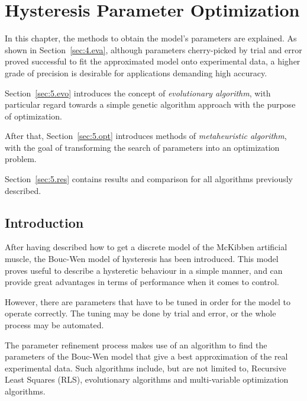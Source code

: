 
\chapter{Hysteresis Parameter Optimization}
\label{ch:optimization}

In this chapter, the methods to obtain the model's parameters are explained.
As shown in Section~\ref{sec:4.eva}, although parameters cherry-picked by trial
and error proved successful to fit the approximated model onto experimental data,
a higher grade of precision is desirable for applications demanding high accuracy.

Section~\ref{sec:5.evo} introduces the concept of \textit{evolutionary algorithm},
with particular regard towards a simple genetic algorithm approach
with the purpose of optimization.

After that, Section~\ref{sec:5.opt} introduces methods of \textit{metaheuristic
algorithm}, with the goal of transforming the search of parameters
into an optimization problem.

Section~\ref{sec:5.res} contains results and comparison
for all algorithms previously described.


\section{Introduction}
After having described how to get a discrete model of the McKibben artificial muscle,
the Bouc-Wen model of hysteresis has been introduced.
This model proves useful to describe a hysteretic behaviour in a simple manner,
and can provide great advantages in terms of performance when it comes to control.

However, there are parameters that have to be tuned in order for the model
to operate correctly. The tuning may be done by trial and error, or the whole process
may be automated.

The parameter refinement process makes use of an algorithm to
find the parameters of the Bouc-Wen model that give a best approximation
of the real experimental data. Such algorithms include, but are not limited to,
Recursive Least Squares (RLS), evolutionary algorithms
and multi-variable optimization algorithms.

